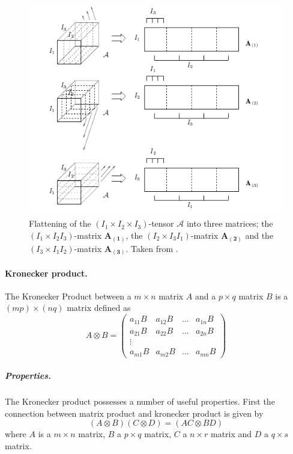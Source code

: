 \documentclass[11pt,a4paper,twoside]{report}
\begin{document}
\begin{figure}[H]
\centering
\includegraphics[scale=0.75]{images/flattening3.png}
\caption{ Flattening of the $(I_1\times I_2 \times I_3)$-tensor $\mathcal{A}$
into three matrices; the $(I_1\times I_2 I_3)$-matrix $\mathbf{A_{(1)}}$,
the $(I_2\times I_3 I_1)$-matrix $\mathbf{A_{(2)}}$ and the $(I_3\times I_1 I_2)$-matrix $\mathbf{A_{(3)}}$. Taken from \cite{multilinear}.}
\label{fg:flat}
\end{figure}

\paragraph{Kronecker product.} The Kronecker Product between a $m \times n$
matrix $A$ and a $p \times q$ matrix $B$ is a $(mp) \times (nq)$ matrix defined
as
\begin{equation}\label{eq:kronecker}
A \otimes B = 
\begin{pmatrix}
a_{11}B & a_{12}B & \ldots & a_{1n}B\\
a_{21}B & a_{22}B & \ldots & a_{2n}B\\
\vdots& & &\\
a_{m1}B & a_{m2}B & \ldots & a_{mn}B
\end{pmatrix}
\end{equation}

\subparagraph{Properties.}The Kronecker product possesses a number of useful properties. First the
connection between matrix product and kronecker product is given by
\begin{equation}\label{eq:kron_mult}
(A \otimes B)(C \otimes D) = (AC \otimes BD)
\end{equation}
where $A$ is a $m \times n$ matrix, $B$ a $p \times q$ matrix, $C$ a $n \times
r$ matrix and $D$ a $q \times s$ matrix.
\end{document}
